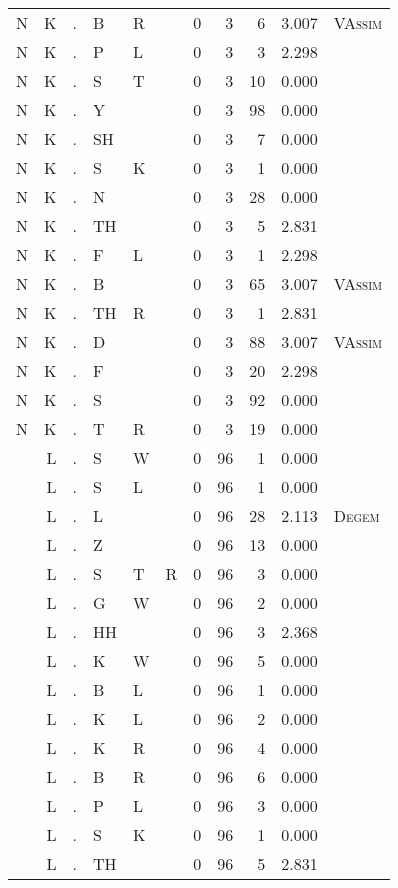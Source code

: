 \begin{longtable}{r@{ } r@{ } c@{ } l@{ } l@{ } l@{ } r r r r l }
N & K & . & B & R &  & 0 & 3 & 6 & 3.007 & \textsc{VAssim} \\
N & K & . & P & L &  & 0 & 3 & 3 & 2.298 &  \\
N & K & . & S & T &  & 0 & 3 & 10 & 0.000 &  \\
N & K & . & Y &  &  & 0 & 3 & 98 & 0.000 &  \\
N & K & . & SH &  &  & 0 & 3 & 7 & 0.000 &  \\
N & K & . & S & K &  & 0 & 3 & 1 & 0.000 &  \\
N & K & . & N &  &  & 0 & 3 & 28 & 0.000 &  \\
N & K & . & TH &  &  & 0 & 3 & 5 & 2.831 &  \\
N & K & . & F & L &  & 0 & 3 & 1 & 2.298 &  \\
N & K & . & B &  &  & 0 & 3 & 65 & 3.007 & \textsc{VAssim} \\
N & K & . & TH & R &  & 0 & 3 & 1 & 2.831 &  \\
N & K & . & D &  &  & 0 & 3 & 88 & 3.007 & \textsc{VAssim} \\
N & K & . & F &  &  & 0 & 3 & 20 & 2.298 &  \\
N & K & . & S &  &  & 0 & 3 & 92 & 0.000 &  \\
N & K & . & T & R &  & 0 & 3 & 19 & 0.000 &  \\
 & L & . & S & W &  & 0 & 96 & 1 & 0.000 &  \\
 & L & . & S & L &  & 0 & 96 & 1 & 0.000 &  \\
 & L & . & L &  &  & 0 & 96 & 28 & 2.113 & \textsc{Degem} \\
 & L & . & Z &  &  & 0 & 96 & 13 & 0.000 &  \\
 & L & . & S & T & R & 0 & 96 & 3 & 0.000 &  \\
 & L & . & G & W &  & 0 & 96 & 2 & 0.000 &  \\
 & L & . & HH &  &  & 0 & 96 & 3 & 2.368 &  \\
 & L & . & K & W &  & 0 & 96 & 5 & 0.000 &  \\
 & L & . & B & L &  & 0 & 96 & 1 & 0.000 &  \\
 & L & . & K & L &  & 0 & 96 & 2 & 0.000 &  \\
 & L & . & K & R &  & 0 & 96 & 4 & 0.000 &  \\
 & L & . & B & R &  & 0 & 96 & 6 & 0.000 &  \\
 & L & . & P & L &  & 0 & 96 & 3 & 0.000 &  \\
 & L & . & S & K &  & 0 & 96 & 1 & 0.000 &  \\
 & L & . & TH &  &  & 0 & 96 & 5 & 2.831 &  \\

\end{longtable}
